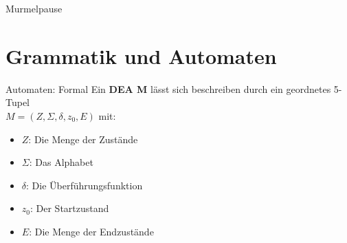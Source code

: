 \documentclass[10pt]{beamer}
\begin{document}




\begin{frame}[standout]
  Murmelpause
\end{frame}

\section{Grammatik und Automaten}

\begin{frame}{Automaten: Formal}
    Ein \textbf{DEA M} lässt sich beschreiben durch ein geordnetes 5-Tupel\\
    \alert{$M=(Z, \Sigma, \delta, z_0, E)$} mit:
    \begin{itemize}
        \item $Z$: Die Menge der Zustände
        \item $\Sigma$: Das Alphabet
        \item $\delta$: Die Überführungsfunktion
        \item $z_0$: Der Startzustand
        \item $E$: Die Menge der Endzustände
    \end{itemize}
\end{frame}
\end{document}
